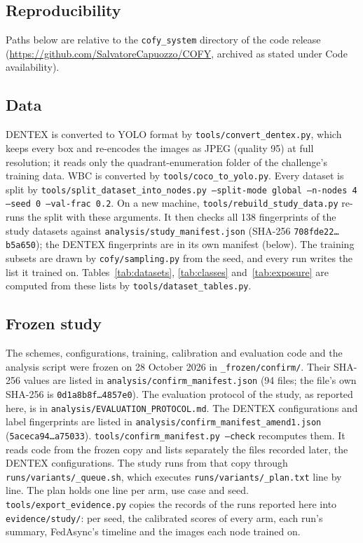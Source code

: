 \documentclass[pdflatex,sn-mathphys-num]{sn-jnl}
\begin{document}
\begin{appendices}
\sloppy

\section{Reproducibility}\label{app:repro}
Paths below are relative to the \texttt{cofy\_system} directory of the code release (\url{https://github.com/SalvatoreCapuozzo/COFY}, archived as stated under Code availability).

\subsection{Data}
 DENTEX is converted to YOLO format by \texttt{tools/convert\_dentex.py}, which keeps every box and re-encodes the images as JPEG (quality 95) at full resolution; it reads only the quadrant-enumeration folder of the challenge's training data. WBC is converted by \texttt{tools/coco\_to\_yolo.py}. Every dataset is split by \texttt{tools/split\_dataset\_into\_nodes.py --split-mode global --n-nodes 4 --seed 0 --val-frac 0.2}. On a new machine, \texttt{tools/rebuild\_study\_data.py} re-runs the split with these arguments. It then checks all 138 fingerprints of the study datasets against \texttt{analysis/study\_manifest.json} (SHA-256 \texttt{708fde22\ldots{}b5a650}); the DENTEX fingerprints are in its own manifest (below). The training subsets are drawn by \texttt{cofy/sampling.py} from the seed, and every run writes the list it trained on. Tables~\ref{tab:datasets}, \ref{tab:classes} and~\ref{tab:exposure} are computed from these lists by \texttt{tools/dataset\_tables.py}.

\subsection{Frozen study}
 The schemes, configurations, training, calibration and evaluation code and the analysis script were frozen on 28 October 2026 in \texttt{\_frozen/confirm/}. Their SHA-256 values are listed in \texttt{analysis/confirm\_manifest.json} (94 files; the file's own SHA-256 is \texttt{0d1a8b8f\ldots{}4857e0}). The evaluation protocol of the study, as reported here, is in \texttt{analysis/EVALUATION\_PROTOCOL.md}. The DENTEX configurations and label fingerprints are listed in \texttt{analysis/confirm\_manifest\_amend1.json} (\texttt{5aceca94\ldots{}a75033}). \texttt{tools/confirm\_manifest.py --check} recomputes them. It reads code from the frozen copy and lists separately the files recorded later, the DENTEX configurations. The study runs from that copy through \texttt{runs/variants/\_queue.sh}, which executes \texttt{runs/variants/\_plan.txt} line by line. The plan holds one line per arm, use case and seed. \texttt{tools/export\_evidence.py} copies the records of the runs reported here into \texttt{evidence/study/}: per seed, the calibrated scores of every arm, each run's summary, FedAsync's timeline and the images each node trained on.


\end{appendices}
\end{document}
